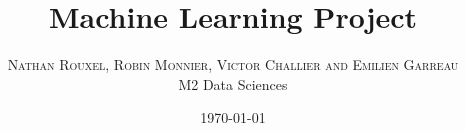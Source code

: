%
%
%
%





\setlength{\droptitle}{-4\baselineskip} %

\pretitle{\begin{center}\Huge\bfseries} %
\posttitle{\end{center}} %
\title{Machine Learning Project} %
\author{%
\textsc{Nathan Rouxel, Robin Monnier, Victor Challier and Emilien Garreau} \\
\normalsize M2 Data Sciences \\ %
}
\date{\today} %
\renewcommand{\maketitlehookd}{%
\begin{abstract}
  balablabalabalbalb
\end{abstract}
}




\maketitle

\tableofcontents



%











